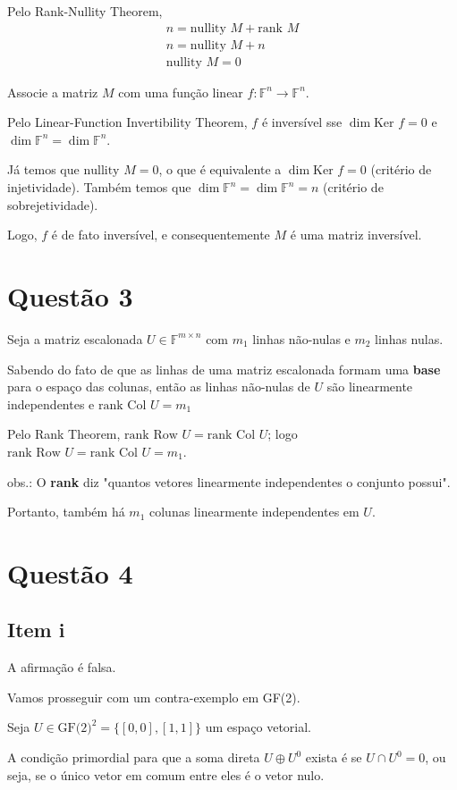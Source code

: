 \documentclass{article}
\newcommand{\F}[1]{\mathbb{F}^{#1}}
\newcommand{\Col}[1]{\textrm{Col } #1}
\newcommand{\Row}[1]{\textrm{Row } #1}
\newcommand{\nullity}[1]{\textrm{nullity } #1}
\newcommand{\rank}[1]{\textrm{rank } #1}
\newcommand{\GF}{\textrm{GF(2)}}
\begin{document}
Pelo Rank-Nullity Theorem,
\begin{align*}
    n = \nullity{M} + \rank{M}\\
    n = \nullity{M} + n\\
    \nullity{M} = 0
\end{align*}

Associe a matriz $M$ com uma função linear $f: \F{n} \to \F{n}$.

Pelo Linear-Function Invertibility Theorem, $f$ é inversível sse $\dim \textrm{Ker }f = 0$ e $\dim \F{n} = \dim \F{n}$.

Já temos que $\nullity{M} = 0$, o que é equivalente a $\dim \textrm{Ker }f = 0$ (critério de injetividade).
Também temos que $\dim \F{n} = \dim \F{n} = n$ (critério de sobrejetividade).

Logo, $f$ é de fato inversível, e consequentemente $M$ é uma matriz inversível.


\section*{Questão 3}
Seja a matriz escalonada $U \in \F{m \times n}$ com $m_1$ linhas não-nulas e $m_2$ linhas nulas.

Sabendo do fato de que as linhas de uma matriz escalonada formam uma \textbf{base} para o espaço das colunas, então as linhas não-nulas de $U$ são linearmente independentes e $\rank{\Col{U}} = m_1$

Pelo Rank Theorem, $\rank{\Row{U}} = \rank{\Col{U}}$; logo $\rank{\Row{U}} = \rank{\Col{U}} = m_1$.
\medskip

obs.: O \textbf{rank} diz "quantos vetores linearmente independentes o conjunto possui".

\medskip
Portanto, também há $m_1$ colunas linearmente independentes em $U$.



\section*{Questão 4}
\subsection*{Item i}
A afirmação é falsa.

Vamos prosseguir com um contra-exemplo em GF(2).

Seja $U \in \GF^2 = \{ [0, 0], [1, 1] \}$ um espaço vetorial.

A condição primordial para que a soma direta $ U \oplus U^0$ exista é se $U \cap U^0 = {0}$, ou seja, se o único vetor em comum entre eles é o vetor nulo.
\end{document}
